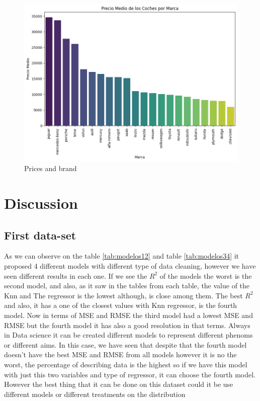 \documentclass{article}
\begin{document}
\begin{figure}[H]
\begin{minipage}[b]{0.3\textwidth}
    \centering
    \includegraphics[width=\textwidth]{t3.png}
    \caption*{Prices and brand}
    \label{fig:t3}
\end{minipage}
\end{figure}
\section{Discussion}
\subsection{First data-set}
As we can observe on the table \ref{tab:modelos12} and table \ref{tab:modelos34} it proposed 4 different models with different type of data cleaning, however we have seen different results in each one. If we see the $R^2$ of the models the worst is the second model, and also, as it saw in the tables from each table, the value of the Knn and The regressor is the lowest although, is close among them. The best $R^2$ and also, it has a one of the closest values with Knn regressor, is the fourth model.
Now in terms of MSE and RMSE the third model had a lowest MSE and RMSE but the fourth model it has also a good resolution in that terms.
Always in Data science it can be created different models to represent different phenoms or different aims. In this case, we have seen that despite that the fourth model doesn't have the best MSE and RMSE from all models however it is no the worst, the percentage of describing data is the highest so if we have this model with just this two variables and type of regressor, it can choose the fourth model. However the best thing that it can be done on this dataset could it be use different models or different treatments on the distribution
\end{document}
